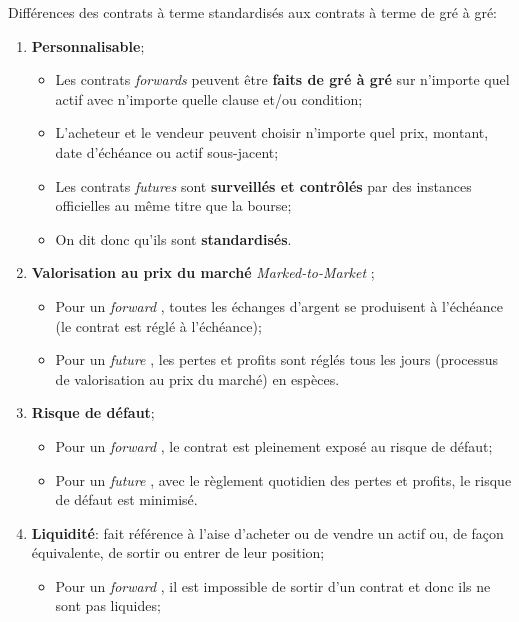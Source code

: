 \documentclass[10pt, french]{article}
\begin{document}
\begin{multicols*}{2}
\begin{definitionNOHFILL}
Différences des contrats à terme standardisés aux contrats à terme de gré à gré:
\begin{enumerate}[label	=	\circled{\arabic*}{lightgray}]
	\item	\textbf{Personnalisable};
		\begin{itemize}[leftmargin = *]
		\item	Les contrats \og \textit{forwards} \fg{} peuvent être \textbf{faits de gré à gré} sur n'importe quel actif avec n'importe quelle clause et/ou condition;
		\item[]	L'acheteur et le vendeur peuvent choisir n'importe quel prix, montant, date d'échéance ou actif sous-jacent;	
		\item	Les contrats \og \textit{futures} \fg{} sont \textbf{surveillés et contrôlés} par des instances officielles au même titre que la bourse;
		\item[]	On dit donc qu'ils sont \textbf{standardisés}.
		\end{itemize}
	\item	\textbf{Valorisation au prix du marché} \og \textit{Marked-to-Market} \fg{};
		\begin{itemize}[leftmargin = *]
		\item	Pour un \og \textit{forward} \fg{}, toutes les échanges d'argent se produisent à l'échéance (le contrat est réglé à l'échéance);	
		\item	Pour un \og \textit{future} \fg{}, les pertes et profits sont réglés tous les jours (processus de valorisation au prix du marché) en espèces.
		\end{itemize}
	\item	\textbf{Risque de défaut};
		\begin{itemize}[leftmargin = *]
		\item	Pour un \og \textit{forward} \fg{}, le contrat est pleinement exposé au risque de défaut; 
		\item	Pour un \og \textit{future} \fg{}, avec le règlement quotidien des pertes et profits, le risque de défaut est minimisé.
		\end{itemize}
	\item	\textbf{Liquidité}: fait référence à l'aise d'acheter ou de vendre un actif ou, de façon équivalente, de sortir ou entrer de leur position;
		\begin{itemize}[leftmargin = *]
		\item	Pour un \og \textit{forward} \fg{}, il est impossible de sortir d'un contrat et donc ils ne sont pas liquides;

\end{itemize}
\end{enumerate}
\end{definitionNOHFILL}
\end{multicols*}
\end{document}
